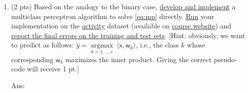 \documentclass[10pt,letter,notitlepage]{article}
\newcommand{\inner}[2]{\langle #1, #2 \rangle}
\newcommand{\xbs}{\bm{\mathsf{x}}}
\newcommand{\wbs}{\bm{\mathsf{w}}}
\newcommand{\argmax}{\mathop{\mathrm{argmax}}}
\newcommand{\ie}{{i.e.}\xspace}
\newcommand{\ans}[1]{{\color{orange}\textsf{Ans}: #1}}
\begin{document}
\begin{exercise}
\begin{enumerate}
	\ans{\vskip3cm
	}
	
	\item (2 pts) Based on the analogy to the binary case, \uline{develop and implement} a multiclass perceptron algorithm to solve \eqref{eq:mp} directly. \uline{Run} your implementation on the \href{https://archive-beta.ics.uci.edu/ml/datasets/human+activity+recognition+using+smartphones}{activity} dataset (available on \href{https://cs.uwaterloo.ca/~y328yu/mycourses/480/assignment.html}{course website}) and \uline{report the final errors on the training and test sets}. [Hint: obviously, we want to predict as follows: $\hat y = \argmax\limits_{k=1, \ldots, c}~ \inner{\xbs}{\wbs_k}$, \ie, the class $k$ whose corresponding $\wbs_k$ maximizes the inner product. Giving the correct pseudo-code will receive 1 pt.]
	
	\ans{\vskip8cm}
	\end{enumerate}
\end{exercise}
\end{document}
